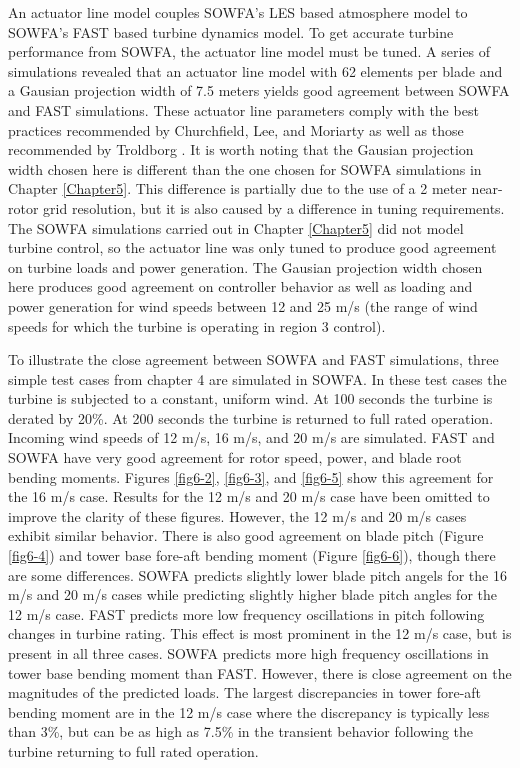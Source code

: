 An actuator line model couples SOWFA's LES based atmosphere model to SOWFA's FAST based turbine dynamics model. To get accurate turbine performance from SOWFA, the actuator line model must be tuned. A series of simulations revealed that an actuator line model with 62 elements per blade and a Gausian projection width of 7.5 meters yields good agreement between SOWFA and FAST simulations. These actuator line parameters comply with the best practices recommended by Churchfield, Lee, and Moriarty \cite{churchfield2012} as well as those recommended by Troldborg \cite{troldborg2009}. It is worth noting that the Gausian projection width chosen here is different than the one chosen for SOWFA simulations in Chapter \ref{Chapter5}. This difference is partially due to the use of a 2 meter near-rotor grid resolution, but it is also caused by a difference in tuning requirements. The SOWFA simulations carried out in Chapter \ref{Chapter5} did not model turbine control, so the actuator line was only tuned to produce good agreement on turbine loads and power generation. The Gausian projection width chosen here produces good agreement on controller behavior as well as loading and power generation for wind speeds between 12 and 25 m/s (the range of wind speeds for which the turbine is operating in region 3 control).

To illustrate the close agreement between SOWFA and FAST simulations, three simple test cases from chapter 4 are simulated in SOWFA. In these test cases the turbine is subjected to a constant, uniform wind. At 100 seconds the turbine is derated by 20\%. At 200 seconds the turbine is returned to full rated operation. Incoming wind speeds of 12 m/s, 16 m/s, and 20 m/s are simulated. FAST and SOWFA have very good agreement for rotor speed, power, and blade root bending moments. Figures \ref{fig6-2}, \ref{fig6-3}, and \ref{fig6-5} show this agreement for the 16 m/s case. Results for the 12 m/s and 20 m/s case have been omitted to improve the clarity of these figures. However, the 12 m/s and 20 m/s cases exhibit similar behavior. There is also good agreement on blade pitch (Figure \ref{fig6-4}) and tower base fore-aft bending moment (Figure \ref{fig6-6}), though there are some differences. SOWFA predicts slightly lower blade pitch angels for the 16 m/s and 20 m/s cases while predicting slightly higher blade pitch angles for the 12 m/s case. FAST predicts more low frequency oscillations in pitch following changes in turbine rating. This effect is most prominent in the 12 m/s case, but is present in all three cases. SOWFA predicts more high frequency oscillations in tower base bending moment than FAST. However, there is close agreement on the magnitudes of the predicted loads. The largest discrepancies in tower fore-aft bending moment are in the 12 m/s case where the discrepancy is typically less than 3\%, but can be as high as 7.5\% in the transient behavior following the turbine returning to full rated operation. 

